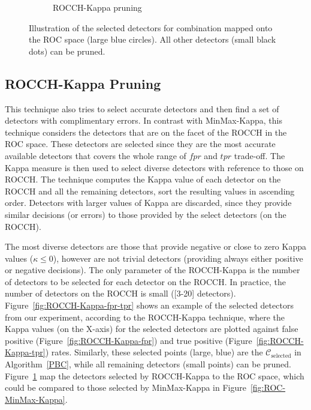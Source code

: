 \begin{figure}[tbh]
\begin{adjustbox}{minipage=\linewidth,scale=0.8}
\begin{subfigure}[b]{\columnwidth}
        \caption{ROCCH-Kappa pruning}
        \label{fig:ROC-ROCCH-Kappa}
    \end{subfigure}
    \caption{Illustration of the selected detectors for combination mapped onto the ROC space (large blue circles). All other detectors (small black dots) can be pruned.}
    \label{fig:ROC-MinMax-vs-ROCCH-Kappa}
    \end{adjustbox}
\end{figure}


\subsection{ROCCH-Kappa Pruning}
\label{sub:rocch-kappa}

This technique also tries to select accurate detectors and then find a set of detectors with complimentary errors.
In contrast with MinMax-Kappa, this technique considers the detectors that are on the facet of the ROCCH in the ROC space.
These detectors are selected since they are the most accurate available detectors that covers the whole range of $fpr$ and $tpr$ trade-off.
The Kappa measure is then used to select diverse detectors with reference to those on ROCCH.
The technique computes the Kappa value of each detector on the ROCCH and all the remaining detectors, sort the resulting values in ascending order.
Detectors with larger values of Kappa are discarded, since they provide similar decisions (or errors) to those provided by the select detectors (on the ROCCH).

The most diverse detectors are those that provide negative or close to zero Kappa values ($\kappa \leq 0$), however are not trivial detectors (providing always either positive or negative decisions).
The only parameter of the ROCCH-Kappa is the number of detectors to be selected for each detector on the ROCCH.
In practice, the number of detectors on the ROCCH is small ([3-20] detectors).
Figure~\ref{fig:ROCCH-Kappa-fpr-tpr} shows an example of the selected detectors from our experiment, according to the ROCCH-Kappa technique, where the Kappa values (on the X-axis) for the selected detectors are plotted against false positive (Figure~\ref{fig:ROCCH-Kappa-fpr}) and true positive  (Figure~\ref{fig:ROCCH-Kappa-tpr}) rates.
Similarly, these selected points (large, blue) are the $\mathcal{C}_{\mbox{selected}}$ in Algorithm~\ref{PBC}, while all remaining detectors (small points) can be pruned.
Figure~\ref{fig:ROC-ROCCH-Kappa} map the detectors selected by ROCCH-Kappa to the ROC space, which could be compared to those selected by MinMax-Kappa in Figure~\ref{fig:ROC-MinMax-Kappa}.

